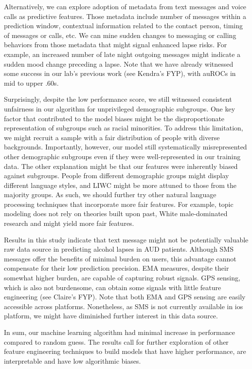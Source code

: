 \documentclass[
  letterpaper,
  DIV=11,
  numbers=noendperiod]{scrartcl}
\begin{document}
Alternatively, we can explore adoption of metadata from text messages
and voice calls as predictive features. Those metadata include number of
messages within a prediction window, contextual information related to
the contact person, timing of messages or calls, etc. We can mine sudden
changes to messaging or calling behaviors from those metadata that might
signal enhanced lapse risks. For example, an increased number of late
night outgoing messages might indicate a sudden mood change preceding a
lapse. Note that we have already witnessed some success in our lab's
previous work (see Kendra's FYP), with auROCs in mid to upper .60s.

Surprisingly, despite the low performance score, we still witnessed
consistent unfairness in our algorithm for unprivileged demographic
subgroups. One key factor that contributed to the model biases might be
the disproportionate representation of subgroups such as racial
minorities. To address this limitation, we might recruit a sample with a
fair distribution of people with diverse backgrounds. Importantly,
however, our model still systematically misrepresented other demographic
subgroups even if they were well-represented in our training data. The
other explanation might be that our features were inherently biased
against subgroups. People from different demographic groups might
display different language styles, and LIWC might be more attuned to
those from the majority groups. As such, we should further try other
natural language processing techniques that incorporate more fair
features. For example, topic modeling does not rely on theories built
upon past, White male-dominated research and might yield more fair
features.

Results in this study indicate that text message might not be
potentially valuable raw data source in predicting alcohol lapses in AUD
patients. Although SMS messages offer the benefits of minimal burden on
users, this advantage cannot compensate for their low prediction
precision. EMA measures, despite their somewhat higher burden, are
capable of capturing robust signals. GPS sensing, which is also not
burdensome, can obtain some signals with little feature engineering (see
Claire's FYP). Note that both EMA and GPS sensing are easily accessible
across platforms. Nonetheless, as SMS is not currently available in ios
platform, we might have diminished further interest in this data source.

In sum, our machine learning algorithm had minimal increase in
performance compared to random guess. The results call for further
exploration of other feature engineering techniques to build models that
have higher performance, are interpretable and have low algorithmic
biases.
\end{document}

